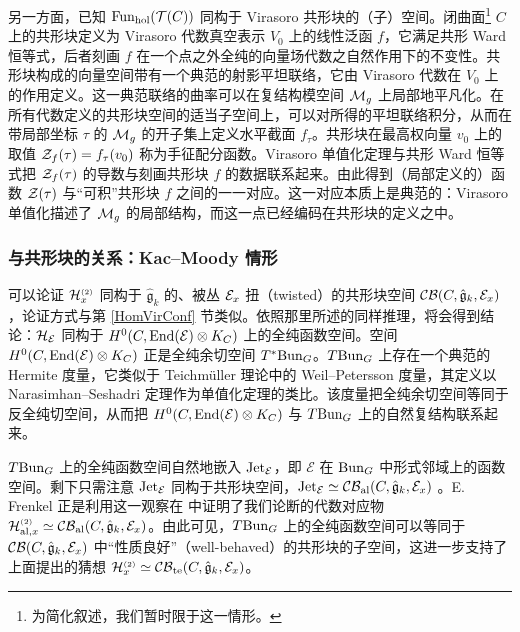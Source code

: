 另一方面，已知 ${\rm Fun}_{\rm hol}(\mathcal{T}(C))$ 同构于 Virasoro 共形块的（子）空间。闭曲面\footnote{为简化叙述，我们暂时限于这一情形。} $C$ 上的共形块定义为 Virasoro 代数真空表示 $V_0$ 上的线性泛函 $f$，它满足共形 Ward 恒等式，后者刻画 $f$ 在一个点之外全纯的向量场代数之自然作用下的不变性。共形块构成的向量空间带有一个典范的射影平坦联络，它由 Virasoro 代数在 $V_0$ 上的作用定义。这一典范联络的曲率可以在复结构模空间 $\mathcal{M}_{g}$ 上局部地平凡化。在所有代数定义的共形块空间的适当子空间上，可以对所得的平坦联络积分，从而在带局部坐标 $\tau$ 的 $\mathcal{M}_{g}$ 的开子集上定义水平截面 $f_{\tau}$。共形块在最高权向量 $v_0$ 上的取值 $\mathcal{Z}_f(\tau)=f_\tau(v_0)$ 称为手征配分函数。Virasoro 单值化定理与共形 Ward 恒等式把 $\mathcal{Z}_f(\tau)$ 的导数与刻画共形块 $f$ 的数据联系起来。由此得到（局部定义的）函数 $\mathcal{Z}(\tau)$ 与“可积”共形块 $f$ 之间的一一对应。这一对应本质上是典范的：Virasoro 单值化描述了 $\mathcal{M}_{g}$ 的局部结构，而这一点已经编码在共形块的定义之中。

\subsubsection{与共形块的关系：Kac--Moody 情形}

可以论证 $\mathcal{H}_x^{\scriptscriptstyle (2)}$ 同构于 $\hat{\mathfrak{g}}_k$ 的、被丛 $\mathcal{E}_x$ 扭（twisted）的共形块空间 $\mathcal{CB}(C,\hat{\mathfrak{g}}_k,\mathcal{E}_x)$，论证方式与第 \ref{HomVirConf} 节类似。依照那里所述的同样推理，将会得到结论：$\mathcal{H}_{\mathcal{E}}$ 同构于 $H^0(C,{\rm End}(\mathcal{E})\otimes K_C)$ 上的全纯函数空间。空间 $H^0(C,{\rm End}(\mathcal{E})\otimes K_C)$ 正是全纯余切空间 $T^*{\rm Bun}_G$。$T{\rm Bun}_G$ 上存在一个典范的 Hermite 度量，它类似于 Teichmüller 理论中的 Weil--Petersson 度量，其定义以 Narasimhan--Seshadri 定理作为单值化定理的类比。该度量把全纯余切空间等同于反全纯切空间，从而把 $H^0(C,{\rm End}(\mathcal{E})\otimes K_C)$ 与 $T{\rm Bun}_G$ 上的自然复结构联系起来。

$T{\rm Bun}_G$ 上的全纯函数空间自然地嵌入 $\operatorname{Jet}_\mathcal{E}$，即 $\mathcal{E}$ 在 ${\rm Bun}_G$ 中形式邻域上的函数空间。剩下只需注意 $\operatorname{Jet}_\mathcal{E}$ 同构于共形块空间，$\operatorname{Jet}_\mathcal{E}\simeq\mathcal{CB}_{\rm al}(C,\hat{\mathfrak{g}}_k,\mathcal{E}_x)$ \cite[Section 18.2]{FBZ}。E. Frenkel 正是利用这一观察在 \cite{Fr10} 中证明了我们论断的代数对应物 $\mathcal{H}^{\scriptscriptstyle (2)}_{{\rm al},x} \simeq \mathcal{CB}_{\rm al}(C,\hat{\mathfrak{g}}_k,\mathcal{E}_x)$。由此可见，$T{\rm Bun}_G$ 上的全纯函数空间可以等同于 $\mathcal{CB}(C,\hat{\mathfrak{g}}_k,\mathcal{E}_x)$ 中“性质良好”（well-behaved）的共形块的子空间，这进一步支持了上面提出的猜想 $\mathcal{H}^{\scriptscriptstyle (2)}_{x} \simeq \mathcal{CB}_{\rm te}(C,\hat{\mathfrak{g}}_k,\mathcal{E}_x)$。

